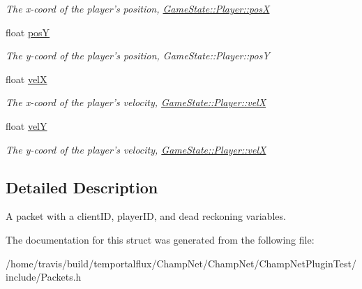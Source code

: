\begin{DoxyCompactItemize}
\begin{DoxyCompactList}\small\item\em The x-\/coord of the player's position, \hyperlink{class_game_state_1_1_player_a0342f6d74f9c08351cd0c5139ac55de6}{Game\-State\-::\-Player\-::pos\-X} \end{DoxyCompactList}\item 
\hypertarget{struct_packet_player_position_a401e60ee7a35eaa7154827814082f794}{float \hyperlink{struct_packet_player_position_a401e60ee7a35eaa7154827814082f794}{pos\-Y}}\label{struct_packet_player_position_a401e60ee7a35eaa7154827814082f794}

\begin{DoxyCompactList}\small\item\em The y-\/coord of the player's position, Game\-State\-::\-Player\-::pos\-Y \end{DoxyCompactList}\item 
\hypertarget{struct_packet_player_position_a4f4b56eb20f827dec38d7ddaf8ea0f13}{float \hyperlink{struct_packet_player_position_a4f4b56eb20f827dec38d7ddaf8ea0f13}{vel\-X}}\label{struct_packet_player_position_a4f4b56eb20f827dec38d7ddaf8ea0f13}

\begin{DoxyCompactList}\small\item\em The x-\/coord of the player's velocity, \hyperlink{class_game_state_1_1_player_afcc72f7f23db9714a20ac1b08fda0288}{Game\-State\-::\-Player\-::vel\-X} \end{DoxyCompactList}\item 
\hypertarget{struct_packet_player_position_abcf1d97becbe982654e73cc9ec8d88c8}{float \hyperlink{struct_packet_player_position_abcf1d97becbe982654e73cc9ec8d88c8}{vel\-Y}}\label{struct_packet_player_position_abcf1d97becbe982654e73cc9ec8d88c8}

\begin{DoxyCompactList}\small\item\em The y-\/coord of the player's velocity, \hyperlink{class_game_state_1_1_player_afcc72f7f23db9714a20ac1b08fda0288}{Game\-State\-::\-Player\-::vel\-X} \end{DoxyCompactList}\end{DoxyCompactItemize}


\subsection{Detailed Description}
A packet with a client\-I\-D, player\-I\-D, and dead reckoning variables. 

The documentation for this struct was generated from the following file\-:\begin{DoxyCompactItemize}
\item 
/home/travis/build/temportalflux/\-Champ\-Net/\-Champ\-Net/\-Champ\-Net\-Plugin\-Test/include/Packets.\-h\end{DoxyCompactItemize}
